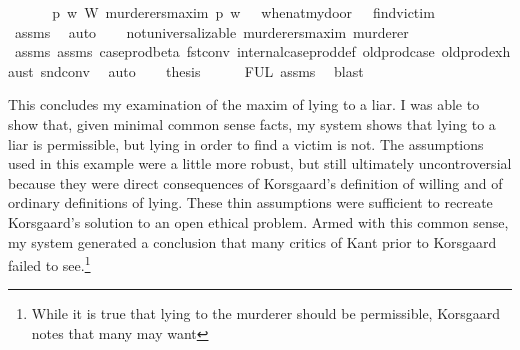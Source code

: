 \begin{isabellebody}
%
\endisadelimproof
%
\isatagproof
{}\isamarkupfalse%
\ {\isacharminus}\ \isanewline
\ \ \isamarkupfalse%
\ {\isachardoublequoteopen}{\isacharparenleft}{\isasymforall}p\ w{\isachardot}\ {\isacharparenleft}W\ murderers{\isacharunderscore}maxim\ p{\isacharparenright}\ w{\isacharparenright}\ {\isasymlongrightarrow}\ {\isacharparenleft}{\isasymTurnstile}\ {\isacharparenleft}when{\isacharunderscore}at{\isacharunderscore}my{\isacharunderscore}door\ \isactrlbold {\isasymrightarrow}\ {\isacharparenleft}\isactrlbold {\isasymnot}\ find{\isacharunderscore}victim{\isacharparenright}{\isacharparenright}{\isacharparenright}{\isachardoublequoteclose}\isanewline
\ \ \ \ \isamarkupfalse%
\ assms{\isacharparenleft}{}{\isacharparenright}\ \isamarkupfalse%
\ auto\isanewline
\ \ \isamarkupfalse%
\ {\isachardoublequoteopen}not{\isacharunderscore}universalizable\ murderers{\isacharunderscore}maxim\ murderer{\isachardoublequoteclose}\isanewline
\ \ \ \ \isamarkupfalse%
\ assms{\isacharparenleft}{}{\isacharparenright}\ assms{\isacharparenleft}{}{\isacharparenright}\ case{\isacharunderscore}prod{\isacharunderscore}beta\ fst{\isacharunderscore}conv\ internal{\isacharunderscore}case{\isacharunderscore}prod{\isacharunderscore}def\ old{\isachardot}prod{\isachardot}case\ old{\isachardot}prod{\isachardot}exhaust\ snd{\isacharunderscore}conv\ \isamarkupfalse%
\ auto\isanewline
\ \ \isamarkupfalse%
\ {\isacharquery}thesis\isanewline
\ \ \ \ \isamarkupfalse%
\ FUL\ assms{\isacharparenleft}{}{\isacharparenright}\ \isamarkupfalse%
\ blast\ \isanewline
{}\isamarkupfalse%
%
\endisatagproof
{\isafoldproof}%
%
\isadelimproof
%
\endisadelimproof
%
\begin{isamarkuptext}%
This concludes my examination of the maxim of lying to a liar. I was able to show that, given minimal
common sense facts, my system shows that lying to a liar is permissible, but lying 
in order to find a victim is not. The assumptions used in this example were a little more robust, but still
ultimately uncontroversial because they were direct consequences of Korsgaard's definition of willing 
and of ordinary definitions of lying. These thin assumptions were sufficient to recreate Korsgaard's solution
to an open ethical problem. Armed with this common sense, my system generated 
a conclusion that many critics of Kant prior to Korsgaard failed to see.\footnote{
While it is true that lying to the murderer should be permissible, Korsgaard notes that many may want
}
\end{isamarkuptext}
\end{isabellebody}
